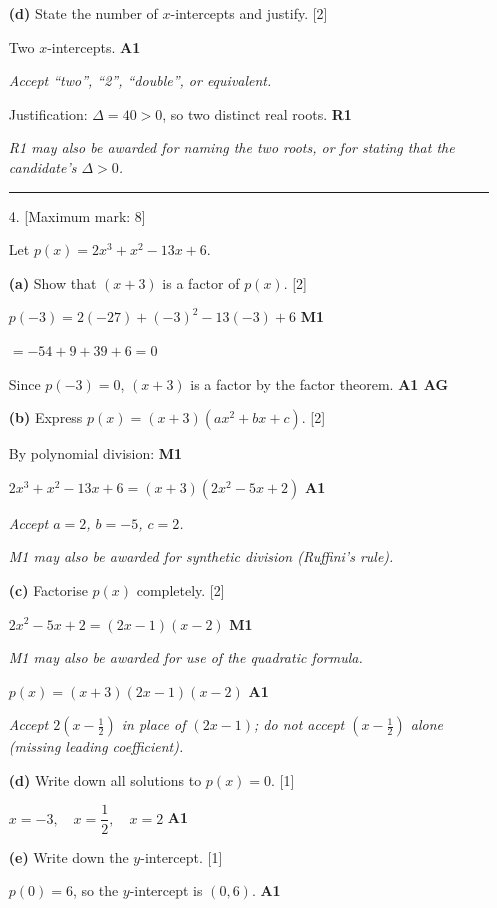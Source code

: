 \documentclass[12pt, twoside]{article}
\begin{document}
\begin{enumerate}[itemsep=0.3cm]
\medskip

\textbf{(d)} State the number of $x$-intercepts and justify. \hfill [2]

Two $x$-intercepts. \hfill \textbf{A1}

\emph{Accept ``two'', ``2'', ``double'', or equivalent.}

Justification: $\Delta = 40 > 0$, so two distinct real roots. \hfill \textbf{R1}

\emph{R1 may also be awarded for naming the two roots, or for stating that the candidate's $\Delta > 0$.}

\bigskip
\hrule
\bigskip

\item[4.] [Maximum mark: 8]

Let $p(x) = 2x^3 + x^2 - 13x + 6$.

\medskip

\textbf{(a)} Show that $(x + 3)$ is a factor of $p(x)$. \hfill [2]

$p(-3) = 2(-27) + (-3)^2 - 13(-3) + 6$ \hfill \textbf{M1}

$= -54 + 9 + 39 + 6 = 0$

Since $p(-3) = 0$, $(x + 3)$ is a factor by the
factor theorem. \hfill \textbf{A1 AG}

\medskip

\textbf{(b)} Express $p(x) = (x + 3)(ax^2 + bx + c)$. \hfill [2]

By polynomial division: \hfill \textbf{M1}

$2x^3 + x^2 - 13x + 6 = (x + 3)(2x^2 - 5x + 2)$ \hfill \textbf{A1}

\emph{Accept $a = 2$, $b = -5$, $c = 2$.}

\emph{M1 may also be awarded for synthetic division (Ruffini's rule).}

\medskip

\textbf{(c)} Factorise $p(x)$ completely. \hfill [2]

$2x^2 - 5x + 2 = (2x - 1)(x - 2)$ \hfill \textbf{M1}

\emph{M1 may also be awarded for use of the quadratic formula.}

$p(x) = (x + 3)(2x - 1)(x - 2)$ \hfill \textbf{A1}

\emph{Accept $2(x - \tfrac{1}{2})$ in place of $(2x - 1)$; do not accept $(x - \tfrac{1}{2})$ alone (missing leading coefficient).}

\medskip

\textbf{(d)} Write down all solutions to $p(x) = 0$. \hfill [1]

$x = -3, \quad x = \dfrac{1}{2}, \quad x = 2$ \hfill \textbf{A1}

\medskip

\textbf{(e)} Write down the $y$-intercept. \hfill [1]

$p(0) = 6$, so the $y$-intercept is $(0, 6)$. \hfill \textbf{A1}

\end{enumerate}
\end{document}
